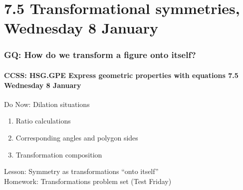 \documentclass{beamer}
\begin{document}
\section{7.5 Transformational symmetries, Wednesday 8 January}
\frame
{
  \frametitle{GQ: How do we transform a figure onto itself?}
  \framesubtitle{CCSS: HSG.GPE Express geometric properties with equations \hfill \alert{7.5 Wednesday 8 January}}

  \begin{block}{Do Now: Dilation situations}
  \begin{enumerate}
    \item Ratio calculations
    \item Corresponding angles and polygon sides
    \item Transformation composition
  \end{enumerate}
  \end{block}
  Lesson: Symmetry as transformations ``onto itself'' \\[0.5cm]
  Homework: Transformations problem set (\alert{Test Friday})
}
\end{document}
